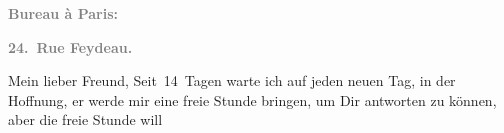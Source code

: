 \pstart
           \begin{otherlanguage}{french}\textcolor{gray}{\textbf{\textbf{Bureau à Paris:}}}\end{otherlanguage}\pend
           
\pstart
           \begin{otherlanguage}{french}\textcolor{gray}{\textbf{\textbf{24. Rue Feydeau.}}}\end{otherlanguage}\pend
           
\pstart\center{}Mein lieber Freund,\pend\vspace{0.5em}
\pstart
           Seit 14 Tagen warte ich auf jeden neuen Tag, in der Hoffnung, er werde mir eine \strikeout{\textcolor{gray}{ne}} freie Stunde bringen, um Dir antworten zu können, aber die freie Stunde will
